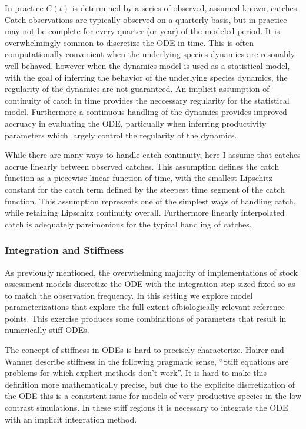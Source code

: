 %
In practice $C(t)$ is determined by a series of observed, assumed known, catches.
Catch observations are typically observed on a quarterly basis, but
in practice may not be complete for every quarter (or year) of the modeled
period. It is overwhelmingly common to discretize the ODE in time. 
This is often computationally convenient when the underlying species
dynamics are resonably well behaved, however when the dynamics model is used
as a statistical model, with the goal of inferring the behavior of the
underlying species dynamics, the regularity of the dynamics are not guaranteed.
An implicit assumption of continuity of catch in time provides the neccessary
regularity for the statistical model. Furthermore a continuous handling of the
dynamics provides improved accruacy in evaluating the ODE, particually when
inferring productivity parameters which largely control the regularity of the
dynamics.

%
While there are many ways to handle catch continuity, here I assume that catches 
accrue linearly between observed catches. This assumption defines the catch
function as a piecewise linear function of time, with the smallest Lipschitz
constant for the catch term defined by the steepest time segment of the catch
function. This assumption represents one of the simplest ways of handling catch,
while retaining Lipschitz continuity overall. Furthermore linearly interpolated
catch is adequately parsimonious for the typical handling of catches.

%
\subsubsection{Integration and Stiffness}

%
As previously mentioned, the overwhelming majority of implementations of
stock assessment models discretize the ODE %
with the integration step sized fixed so as to match the observation frequency. 
In this setting we explore model parameterizations that explore the full 
extent ofbiologically relevant reference points. This exercise produces 
some combinations of parameters that result in numerically stiff ODEs.

%
The concept of stiffness in ODEs is hard to precisely characterize.
Hairer and Wanner \cite[p.2]{wanner_solving_1996} describe stiffness in the
following pragmatic sense, ``Stiff equations are problems for which explicit
methods don't work''. It is hard to make this definition more mathematically
precise, but due to the explicite discretization of the ODE this is a consistent 
issue for models of very productive species in the low contrast simulations. 
In these stiff regions it is necessary to integrate the ODE with an implicit integration method.

